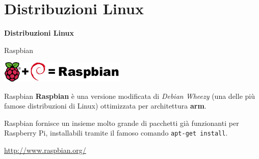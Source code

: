\documentclass[xcolor=svgnames,11pt]{beamer}
\begin{document}
\section{Distribuzioni Linux}

\begin{frame}{}
\begin{center}
\begin{Huge}
{\color{green_raspi} \textbf{Distribuzioni Linux}}
\end{Huge}
\end{center}
\end{frame}

\begin{frame}{Raspbian}
\begin{center}
\includegraphics[width=6cm]{raspbian_logo.png}
\end{center}

\pause
\medskip

\begin{block}{Raspbian}
\textbf{Raspbian} \`e una versione modificata di \emph{Debian Wheezy} (una delle pi\`u famose distribuzioni di Linux) ottimizzata per architettura \textbf{arm}.
\end{block}

\pause
\medskip

Raspbian fornisce un insieme molto grande di pacchetti gi\`a funzionanti per Raspberry Pi, installabili tramite il famoso comando \texttt{apt-get install}.

\pause
\medskip
\begin{center}
\url{http://www.raspbian.org/}
\end{center}
\end{frame}
\end{document}

